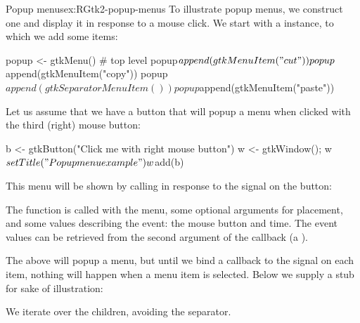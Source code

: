 \begin{example}{Popup menus}{ex:RGtk2-popup-menus}
To illustrate popup menus, we construct one and display it in response
to a mouse click. We start with a  instance, to which we
add some items:
\begin{Schunk}
\begin{Sinput}
 popup <- gtkMenu()                       # top level
 popup$append(gtkMenuItem("cut"))
 popup$append(gtkMenuItem("copy"))
 popup$append(gtkSeparatorMenuItem())
 popup$append(gtkMenuItem("paste"))
\end{Sinput}
\end{Schunk}

Let us assume that we have a button that will popup a menu when
clicked with the third (right) mouse button:
\begin{Schunk}
\begin{Sinput}
 b <- gtkButton("Click me with right mouse button")
 w <- gtkWindow(); w$setTitle("Popup menu example")
 w$add(b)
\end{Sinput}
\end{Schunk}

This menu will be shown by calling  in response to
the  signal on the button:
\begin{Schunk}
\end{Schunk}
%
The  function is called with the menu, some
optional arguments for placement, and some values describing the
event: the mouse button and time. The event values can be retrieved
from the second argument of the callback (a ).

The above will popup a menu, but until we bind a callback to the
 signal on each item, nothing will happen when a menu
item is selected. Below we supply a stub for sake of illustration:
\begin{Schunk}
\end{Schunk}
%
We iterate over the children, avoiding the separator.
\end{example}

